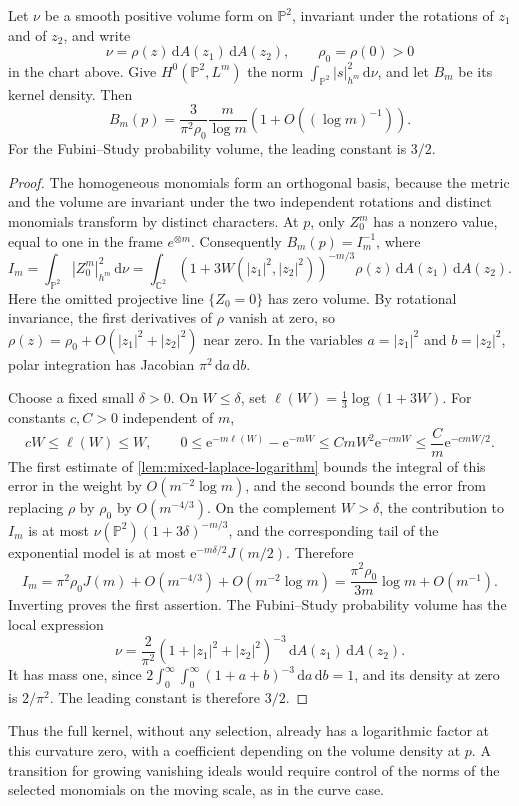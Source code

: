 \begin{proposition}\label{prop:projective-logarithmic-kernel}
Let $\nu$ be a smooth positive volume form on $\mathbb P^2$, invariant under the rotations of $z_1$ and of $z_2$, and write
\[
 \nu=\rho(z)\,\mathrm dA(z_1)\,\mathrm dA(z_2),\qquad \rho_0=\rho(0)>0
\]
in the chart above. Give $H^0(\mathbb P^2,L^m)$ the norm $\int_{\mathbb P^2}|s|_{h^m}^2\,\mathrm d\nu$, and let $B_m$ be its kernel density. Then
\[
 B_m(p)=\frac{3}{\pi^2\rho_0}\frac m{\log m}
                   \left(1+O((\log m)^{-1})\right).
\]
For the Fubini--Study probability volume, the leading constant is $3/2$.
\end{proposition}
\begin{proof}
The homogeneous monomials form an orthogonal basis, because the metric and the volume are invariant under the two independent rotations and distinct monomials transform by distinct characters. At $p$, only $Z_0^m$ has a nonzero value, equal to one in the frame $e^{\otimes m}$. Consequently $B_m(p)=I_m^{-1}$, where
\[
 I_m=\int_{\mathbb P^2}|Z_0^m|_{h^m}^2\,\mathrm d\nu
       =\int_{\mathbb C^2}(1+3W(|z_1|^2,|z_2|^2))^{-m/3}
                       \rho(z)\,\mathrm dA(z_1)\,\mathrm dA(z_2).
\]
Here the omitted projective line $\{Z_0=0\}$ has zero volume. By rotational invariance, the first derivatives of $\rho$ vanish at zero, so $\rho(z)=\rho_0+O(|z_1|^2+|z_2|^2)$ near zero. In the variables $a=|z_1|^2$ and $b=|z_2|^2$, polar integration has Jacobian $\pi^2\,\mathrm da\,\mathrm db$.

Choose a fixed small $\delta>0$. On $W\leq\delta$, set $\ell(W)=\tfrac13\log(1+3W)$. For constants $c,C>0$ independent of $m$,
\[
 cW\leq\ell(W)\leq W,\qquad
 0\leq\mathrm e^{-m\ell(W)}-\mathrm e^{-mW}
       \leq CmW^2\mathrm e^{-cmW}
       \leq\frac C m\mathrm e^{-cmW/2}.
\]
The first estimate of \cref{lem:mixed-laplace-logarithm} bounds the integral of this error in the weight by $O(m^{-2}\log m)$, and the second bounds the error from replacing $\rho$ by $\rho_0$ by $O(m^{-4/3})$. On the complement $W>\delta$, the contribution to $I_m$ is at most $\nu(\mathbb P^2)(1+3\delta)^{-m/3}$, and the corresponding tail of the exponential model is at most $\mathrm e^{-m\delta/2}J(m/2)$. Therefore
\[
 I_m=\pi^2\rho_0J(m)+O(m^{-4/3})+O(m^{-2}\log m)
       =\frac{\pi^2\rho_0}{3m}\log m+O(m^{-1}).
\]
Inverting proves the first assertion. The Fubini--Study probability volume has the local expression
\[
 \nu=\frac2{\pi^2}(1+|z_1|^2+|z_2|^2)^{-3}
                     \,\mathrm dA(z_1)\,\mathrm dA(z_2).
\]
It has mass one, since $2\int_0^\infty\int_0^\infty(1+a+b)^{-3}\,\mathrm da\,\mathrm db=1$, and its density at zero is $2/\pi^2$. The leading constant is therefore $3/2$.
\end{proof}

Thus the full kernel, without any selection, already has a logarithmic factor at this curvature zero, with a coefficient depending on the volume density at $p$. A transition for growing vanishing ideals would require control of the norms of the selected monomials on the moving scale, as in the curve case.
